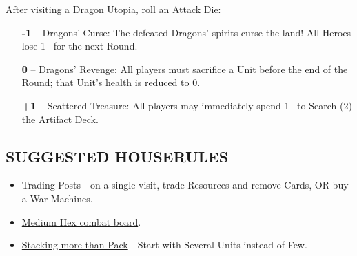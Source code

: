 \begin{multicols*}{2}
After visiting a Dragon Utopia, roll an Attack Die:
\begin{itemize}
  \item[\textbf{-1}] -- Dragons' Curse: The defeated Dragons’ spirits curse the land! All Heroes lose \mbox{1 } for the next Round.
  \item[\textbf{0}] -- Dragons' Revenge: All players must sacrifice a Unit before the end of the Round; that Unit's health is reduced to 0. 
  \item[ \textbf{+1}] -- Scattered Treasure: All players may immediately spend \mbox{1 } to Search (2) the Artifact Deck.
\end{itemize}

\subsection*{\MakeUppercase{Suggested Houserules}}
\begin{itemize}
  \item Trading Posts - on a single visit, trade Resources and remove Cards, OR buy a War Machines.
  \item \href{https://boardgamegeek.com/thread/3445901/custom-hex-combat-board}{Medium Hex combat board}.
  \item \href{https://boardgamegeek.com/thread/3449937/houserule-for-stacking-more-than-pack}{Stacking more than Pack} - Start with Several  Units instead of Few.
\end{itemize}

\vspace*{\fill}

\end{multicols*}

